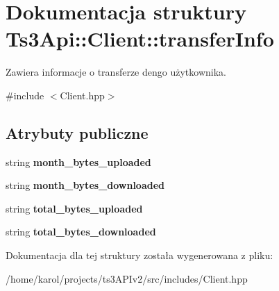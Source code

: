 \hypertarget{struct_ts3_api_1_1_client_1_1transfer_info}{}\section{Dokumentacja struktury Ts3\+Api\+:\+:Client\+:\+:transfer\+Info}
\label{struct_ts3_api_1_1_client_1_1transfer_info}


Zawiera informacje o transferze dengo użytkownika.  




{\ttfamily \#include $<$Client.\+hpp$>$}

\subsection*{Atrybuty publiczne}
\begin{DoxyCompactItemize}
\item 
string {\bfseries month\+\_\+bytes\+\_\+uploaded}\hypertarget{struct_ts3_api_1_1_client_1_1transfer_info_a487dfecb58a865b099ead7e1ef8e9dbf}{}\label{struct_ts3_api_1_1_client_1_1transfer_info_a487dfecb58a865b099ead7e1ef8e9dbf}

\item 
string {\bfseries month\+\_\+bytes\+\_\+downloaded}\hypertarget{struct_ts3_api_1_1_client_1_1transfer_info_a5051375ed95b8aa5babc0cb5acd435df}{}\label{struct_ts3_api_1_1_client_1_1transfer_info_a5051375ed95b8aa5babc0cb5acd435df}

\item 
string {\bfseries total\+\_\+bytes\+\_\+uploaded}\hypertarget{struct_ts3_api_1_1_client_1_1transfer_info_a4932b3fb406e759c6afe5e1e76935104}{}\label{struct_ts3_api_1_1_client_1_1transfer_info_a4932b3fb406e759c6afe5e1e76935104}

\item 
string {\bfseries total\+\_\+bytes\+\_\+downloaded}\hypertarget{struct_ts3_api_1_1_client_1_1transfer_info_aaee3872daf3bc112e7d7042d5b7bcebc}{}\label{struct_ts3_api_1_1_client_1_1transfer_info_aaee3872daf3bc112e7d7042d5b7bcebc}

\end{DoxyCompactItemize}


Dokumentacja dla tej struktury została wygenerowana z pliku\+:\begin{DoxyCompactItemize}
\item 
/home/karol/projects/ts3\+A\+P\+Iv2/src/includes/Client.\+hpp\end{DoxyCompactItemize}
